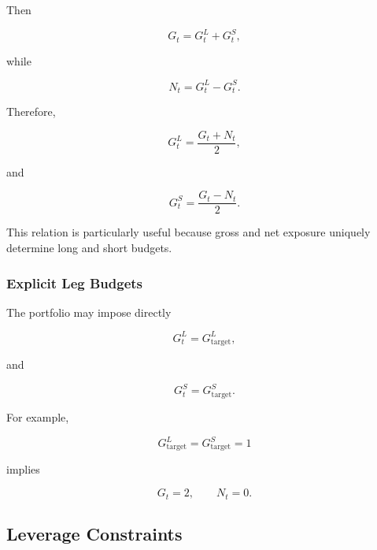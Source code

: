 \documentclass[11pt,a4paper]{article}
\begin{document}
Then

\begin{equation}
\boxed{
G_t
=
G_t^{L}
+
G_t^{S},
}
\end{equation}

while

\begin{equation}
\boxed{
N_t
=
G_t^{L}
-
G_t^{S}.
}
\end{equation}

Therefore,

\begin{equation}
\boxed{
G_t^{L}
=
\frac{
G_t+N_t
}{2},
}
\end{equation}

and

\begin{equation}
\boxed{
G_t^{S}
=
\frac{
G_t-N_t
}{2}.
}
\end{equation}

This relation is particularly useful because gross and net exposure uniquely
determine long and short budgets.


\subsubsection{Explicit Leg Budgets}

The portfolio may impose directly

\begin{equation}
G_t^{L}
=
G_{\mathrm{target}}^{L},
\end{equation}

and

\begin{equation}
G_t^{S}
=
G_{\mathrm{target}}^{S}.
\end{equation}

For example,

\begin{equation}
G_{\mathrm{target}}^{L}
=
G_{\mathrm{target}}^{S}
=
1
\end{equation}

implies

\begin{equation}
G_t=2,
\qquad
N_t=0.
\end{equation}


\subsection{Leverage Constraints}
\label{subsec:leverage_constraints}
\end{document}
